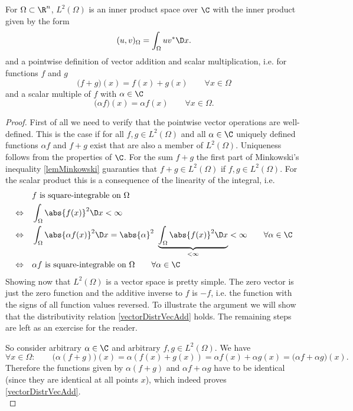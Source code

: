 \begin{lem}
	\label{lem:L2HilbertSpace}
	For $\Omega \subset \R^n$, $L^2(\Omega)$ is an inner product space over $\C$ with the inner product given by the form
	 \begin{equation}
		(u,v)_\Omega = \int_\Omega u v^\ast \D x.
		\label{L2innerProduct}
	\end{equation}
	and a pointwise definition of vector addition and scalar multiplication, i.e. for functions $f$ and $g$
	\[ \Big(f+g\Big)(x) = f(x) + g(x) \qquad \forall x \in \Omega\]
	and a scalar multiple of $f$ with $\alpha \in \C$
	\[ \Big(\alpha f\Big)(x) = \alpha f(x)\qquad \forall x \in \Omega.\]

\end{lem}
\begin{proof}
	First of all we need to verify that the pointwise vector operations are well-defined. 
	This is the case if for all $f,g \in L^2(\Omega)$ and all $\alpha \in \C$ uniquely defined functions $\alpha f$ and $f+g$ exist that are also a member of $L^2(\Omega)$.
	Uniqueness follows from the properties of $\C$. 
	For the sum $f+g$ the first part of Minkowski’s inequality \eqref{lemMinkowski} guaranties that $f+g \in L^2(\Omega)$ if $f,g \in L^2(\Omega)$.
	For the scalar product this is a consequence of the linearity of the integral, i.e.
	\begin{align*}
				&\text{$f$ is square-integrable on $\Omega$} \\
		\Leftrightarrow \quad &\int_\Omega \abs{f(x)}^2 \D x < \infty \\
		\Leftrightarrow \quad& \int_\Omega \abs{\alpha f(x)}^2 \D x = \abs{\alpha}^2~\underbrace{\int_\Omega \abs{f(x)}^2 \D x}_{<\infty} < \infty \qquad \forall \alpha \in \C \\
		\Leftrightarrow \quad& \text{$\alpha f$ is square-integrable on $\Omega$} \qquad \forall \alpha \in \C
	\end{align*}
	Showing now that $L^2(\Omega)$ is a vector space is pretty simple.
	The zero vector is just the zero function and the additive inverse to $f$ is $-f$, i.e. the function with the signs of all function values reversed. 
	To illustrate the argument we will show that the distributivity relation \eqref{vectorDistrVecAdd} holds. 
	The remaining steps are left as an exercise for the reader.
	
	\noindent
	So consider arbitrary $\alpha \in \C$ and arbitrary $f,g \in L^2(\Omega)$. We have 
	\[ \forall x \in \Omega: \qquad \Big( \alpha (f+g) \Big)(x) = \alpha (f(x) + g(x)) = \alpha f(x) + \alpha g(x) = \Big( \alpha f + \alpha g \Big)(x). \]
	Therefore the functions given by $\alpha (f+g)$ and $\alpha f + \alpha g$ have to be identical (since they are identical at all points $x$), which indeed proves \eqref{vectorDistrVecAdd}. \\


\end{proof}

